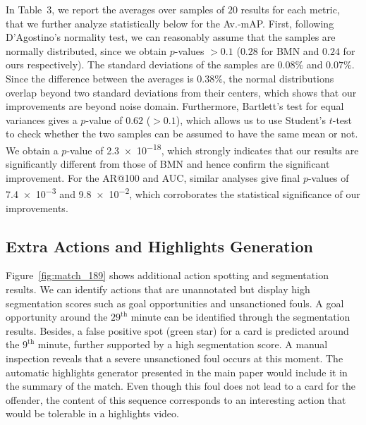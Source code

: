 \documentclass[10pt,twocolumn,letterpaper]{article}
\begin{document}
In Table~3, we report the averages over samples of $20$ results for each metric, that we further analyze statistically below for the Av.-mAP.
First, following D'Agostino's normality test, we can reasonably assume that the samples are normally distributed, since we obtain $p$-values $>0.1$ ($0.28$ for BMN and $0.24$ for ours respectively). The standard deviations of the samples are $0.08\%$ and $0.07\%$. Since the difference between the averages is $0.38\%$, the normal distributions overlap beyond two standard deviations from their centers, which shows that our improvements are beyond noise domain. Furthermore, Bartlett's test for equal variances gives a $p$-value of $0.62$ ($> 0.1$), which allows us to use Student's $t$-test to check whether the two samples can be assumed to have the same mean or not. We obtain a $p$-value of \num{2.3e-18}, which strongly indicates that our results are significantly different from those of BMN and hence confirm the significant improvement.
For the AR@100 and AUC, similar analyses give final $p$-values of \num{7.4e-3} and \num{9.8e-2}, which corroborates the statistical significance of our improvements.


\subsection{Extra Actions and Highlights Generation}


Figure~\ref{fig:match_189} shows additional action spotting and segmentation results. We can identify actions that are unannotated but display high segmentation scores such as goal opportunities and unsanctioned fouls. A goal opportunity around the $29^{\text{th}}$ minute can be identified through the segmentation results. Besides, a false positive spot (green star) for a card is predicted around the $9^{\text{th}}$ minute, further supported by a high segmentation score. A manual inspection reveals that a severe unsanctioned foul occurs at this moment. The automatic highlights generator presented in the main paper would include it in the summary of the match. Even though this foul does not lead to a card for the offender, the content of this sequence corresponds to an interesting action that would be tolerable in a highlights video.
\end{document}
